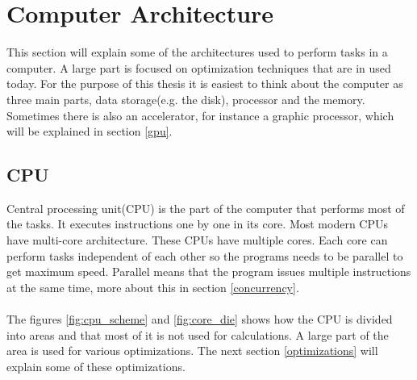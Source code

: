 \documentclass[10pt,a4paper]{report}
\begin{document}
\clearpage
\section{Computer Architecture}
This section will explain some of the architectures used to perform tasks in a computer. A large part is focused on optimization techniques that are in used today. For the purpose of this thesis it is easiest to think about the computer as three main parts, data storage(e.g. the disk), processor and the memory. Sometimes there is also an accelerator, for instance a graphic processor, which will be explained in section \ref{gpu}.


\subsection{CPU}
Central processing unit(CPU) is the part of the computer that performs most of the tasks\cite{introduction_hpc_hager}. It executes instructions one by one in its core. Most modern CPUs have multi-core architecture. These CPUs have multiple cores\cite{introduction_hpc_hager}. Each core can perform tasks independent of each other so the programs needs to be parallel to get maximum speed. Parallel means that the program issues multiple instructions at the same time, more about this in section \ref{concurrency}.\\
\\
The figures \ref{fig:cpu_scheme} and \ref{fig:core_die} shows how the CPU is divided into areas and that most of it is not used for calculations. A large part of the area is used for various optimizations. The next section \ref{optimizations} will explain some of these optimizations.
\end{document}
